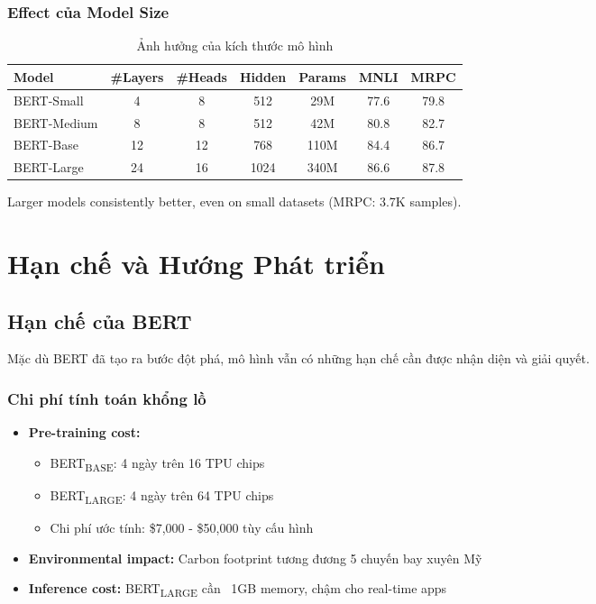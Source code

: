 \subsubsection{Effect của Model Size}
\begin{table}[H]
    \centering
    \caption{Ảnh hưởng của kích thước mô hình}
    \label{tab:model_size_effect}
    \begin{tabular}{lcccccc}
        \toprule
        \textbf{Model} & \textbf{\#Layers} & \textbf{\#Heads} & \textbf{Hidden} & \textbf{Params} & \textbf{MNLI} & \textbf{MRPC} \\
        \midrule
        BERT-Small & 4 & 8 & 512 & 29M & 77.6 & 79.8 \\
        BERT-Medium & 8 & 8 & 512 & 42M & 80.8 & 82.7 \\
        BERT-Base & 12 & 12 & 768 & 110M & 84.4 & 86.7 \\
        BERT-Large & 24 & 16 & 1024 & 340M & 86.6 & 87.8 \\
        \bottomrule
    \end{tabular}
\end{table}

Larger models consistently better, even on small datasets (MRPC: 3.7K samples).

\section{Hạn chế và Hướng Phát triển}
\label{sec:han_che_huong_phat_trien}

\subsection{Hạn chế của BERT}
\label{ssec:han_che_bert}
Mặc dù BERT đã tạo ra bước đột phá, mô hình vẫn có những hạn chế cần được nhận diện và giải quyết.

\subsubsection{Chi phí tính toán khổng lồ}
\begin{itemize}
    \item \textbf{Pre-training cost:}
    \begin{itemize}
        \item BERT\textsubscript{BASE}: 4 ngày trên 16 TPU chips
        \item BERT\textsubscript{LARGE}: 4 ngày trên 64 TPU chips
        \item Chi phí ước tính: \$7,000 - \$50,000 tùy cấu hình
    \end{itemize}
    \item \textbf{Environmental impact:} Carbon footprint tương đương 5 chuyến bay xuyên Mỹ
    \item \textbf{Inference cost:} BERT\textsubscript{LARGE} cần ~1GB memory, chậm cho real-time apps
\end{itemize}

